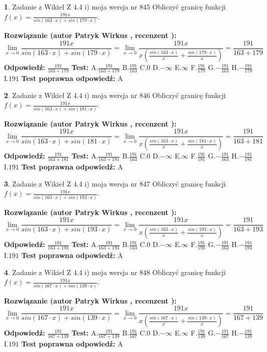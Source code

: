 \documentclass[12pt, a4paper]{article}
\theoremstyle{definition} %
\newtheorem{zad}{}
\newcommand{\zadStart}[1]{\begin{zad}#1\newline}
\newcommand{\zadStop}{\end{zad}}
\newcommand{\rozwStart}[2]{\noindent \textbf{Rozwiązanie (autor #1 , recenzent #2): }\newline}
\newcommand{\rozwStop}{\newline}
\newcommand{\odpStart}{\noindent \textbf{Odpowiedź:}\newline}
\newcommand{\odpStop}{\newline}
\newcommand{\testStart}{\noindent \textbf{Test:}\newline}
\newcommand{\testStop}{\newline}
\newcommand{\kluczStart}{\noindent \textbf{Test poprawna odpowiedź:}\newline}
\newcommand{\kluczStop}{\newline}
\begin{document}
\zadStart{Zadanie z Wikieł Z 4.4 i) moja wersja nr 845}
Obliczyć granicę funkcji $f(x)=\frac{191x}{sin(163\cdot x) +sin(179\cdot x)}$.
\zadStop
\rozwStart{Patryk Wirkus}{}
$$\lim\limits_{x\to 0}\frac{191x}{sin(163\cdot x) +sin(179\cdot x)}=\lim\limits_{x\to 0}\frac{191x}{x(\frac{sin(163\cdot x)}{x}+\frac{sin(179\cdot x)}{x})}=\frac{191}{163+179}$$
\rozwStop
\odpStart
$\frac{191}{163+179}$
\odpStop
\testStart
A.$\frac{191}{163+179}$
B.$\frac{191}{163}$
C.$0$
D.$-\infty$
E.$\infty$
F.$\frac{191}{179}$
G.$-\frac{191}{163}$
H.$-\frac{191}{179}$
I.$191$
\testStop
\kluczStart
A
\kluczStop



\zadStart{Zadanie z Wikieł Z 4.4 i) moja wersja nr 846}
Obliczyć granicę funkcji $f(x)=\frac{191x}{sin(163\cdot x) +sin(181\cdot x)}$.
\zadStop
\rozwStart{Patryk Wirkus}{}
$$\lim\limits_{x\to 0}\frac{191x}{sin(163\cdot x) +sin(181\cdot x)}=\lim\limits_{x\to 0}\frac{191x}{x(\frac{sin(163\cdot x)}{x}+\frac{sin(181\cdot x)}{x})}=\frac{191}{163+181}$$
\rozwStop
\odpStart
$\frac{191}{163+181}$
\odpStop
\testStart
A.$\frac{191}{163+181}$
B.$\frac{191}{163}$
C.$0$
D.$-\infty$
E.$\infty$
F.$\frac{191}{181}$
G.$-\frac{191}{163}$
H.$-\frac{191}{181}$
I.$191$
\testStop
\kluczStart
A
\kluczStop



\zadStart{Zadanie z Wikieł Z 4.4 i) moja wersja nr 847}
Obliczyć granicę funkcji $f(x)=\frac{191x}{sin(163\cdot x) +sin(193\cdot x)}$.
\zadStop
\rozwStart{Patryk Wirkus}{}
$$\lim\limits_{x\to 0}\frac{191x}{sin(163\cdot x) +sin(193\cdot x)}=\lim\limits_{x\to 0}\frac{191x}{x(\frac{sin(163\cdot x)}{x}+\frac{sin(193\cdot x)}{x})}=\frac{191}{163+193}$$
\rozwStop
\odpStart
$\frac{191}{163+193}$
\odpStop
\testStart
A.$\frac{191}{163+193}$
B.$\frac{191}{163}$
C.$0$
D.$-\infty$
E.$\infty$
F.$\frac{191}{193}$
G.$-\frac{191}{163}$
H.$-\frac{191}{193}$
I.$191$
\testStop
\kluczStart
A
\kluczStop



\zadStart{Zadanie z Wikieł Z 4.4 i) moja wersja nr 848}
Obliczyć granicę funkcji $f(x)=\frac{191x}{sin(167\cdot x) +sin(139\cdot x)}$.
\zadStop
\rozwStart{Patryk Wirkus}{}
$$\lim\limits_{x\to 0}\frac{191x}{sin(167\cdot x) +sin(139\cdot x)}=\lim\limits_{x\to 0}\frac{191x}{x(\frac{sin(167\cdot x)}{x}+\frac{sin(139\cdot x)}{x})}=\frac{191}{167+139}$$
\rozwStop
\odpStart
$\frac{191}{167+139}$
\odpStop
\testStart
A.$\frac{191}{167+139}$
B.$\frac{191}{167}$
C.$0$
D.$-\infty$
E.$\infty$
F.$\frac{191}{139}$
G.$-\frac{191}{167}$
H.$-\frac{191}{139}$
I.$191$
\testStop
\kluczStart
A
\kluczStop
\end{document}
